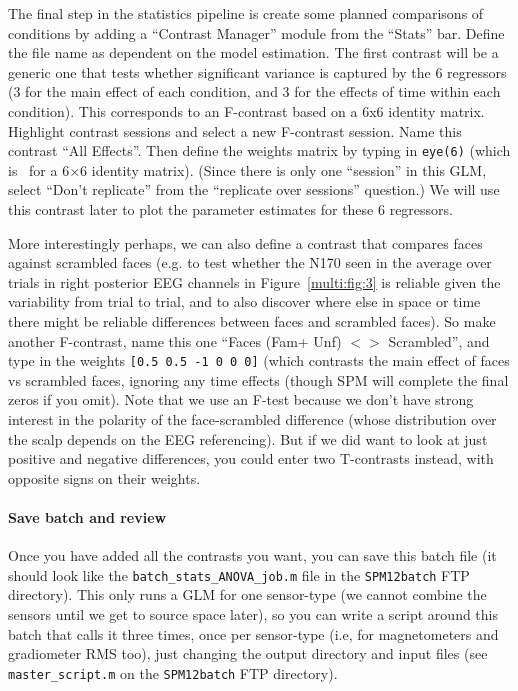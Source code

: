 The final step in the statistics pipeline is create some planned comparisons of conditions by adding a ``Contrast Manager'' module from the ``Stats'' bar. Define the file name as dependent on the model estimation. The first contrast will be a generic one that tests whether significant variance is captured by the 6 regressors (3 for the main effect of each condition, and 3 for the effects of time within each condition). This corresponds to an F-contrast based on a 6x6 identity matrix. Highlight contrast sessions and select a new F-contrast session. Name this contrast ``All Effects''. Then define the weights matrix by typing in \texttt{eye(6)} (which is \matlab\ for a 6\(\times\)6 identity matrix). (Since there is only one ``session'' in this GLM,  select ``Don't replicate'' from the  ``replicate over sessions'' question.) We will use this contrast later to plot the parameter estimates for these 6 regressors.

More interestingly perhaps, we can also define a contrast that compares faces against scrambled faces (e.g. to test whether the N170 seen in the average over trials in right posterior EEG channels in Figure~\ref{multi:fig:3} is reliable given the variability from trial to trial, and to also discover where else in space or time there might be reliable differences between faces and scrambled faces). So make another F-contrast, name this one ``Faces (Fam+ Unf) \(<>\) Scrambled'', and type in the weights \texttt{[0.5 0.5 -1 0 0 0]} (which contrasts the main effect of faces vs scrambled faces, ignoring any time effects (though SPM will complete the final zeros if you omit). Note that we use an F-test because we don't have strong interest in the polarity of the face-scrambled difference (whose distribution over the scalp depends on the EEG referencing). But if we did want to look at just positive and negative differences, you could enter two T-contrasts instead, with opposite signs on their weights.

\paragraph{Save batch and review}

Once you have added all the contrasts you want, you can save this batch file (it should look like the \texttt{batch\_stats\_ANOVA\_job.m} file in the \texttt{SPM12batch} FTP directory). This only runs a GLM for one sensor-type (we cannot combine the sensors until we get to source space later), so you can write a script around this batch that calls it three times, once per sensor-type (i.e, for magnetometers and gradiometer RMS too), just changing the output directory and input files (see \texttt{master\_script.m} on the \texttt{SPM12batch} FTP directory).

